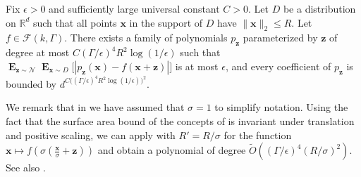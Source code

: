 \documentclass{theoretics}
\newcommand\twonorm[1]{\|#1\|_2}
\renewcommand\vec[1]{\mathbf{#1}}
\DeclareMathOperator*{\E}{\mathbf{E}}
\newcommand{\R}{\mathbb{R}}
\newcommand{\eps}{\epsilon}
\newcommand{\1}{\Ind}
\newcommand{\wt}{\widetilde}
\newcommand{\x}{\vec x}
\newcommand{\z}{\vec z}
\newcommand{\Gauss}{\mathcal{N}}
\begin{document}
\begin{proposition}
    \label{lem: boolean_bounded_approx} 
   Fix $\eps > 0$ and  sufficiently large universal constant $C > 0$. 
    Let $D$ be a distribution on $\R^d$ such that all points $\x$ in the support of $D$ have $\twonorm{\x}\leq R$. Let $f \in \mathcal F(k, \Gamma)$.
    There exists a family of polynomials $p_{\z}$ parameterized by $\z$ of degree at most $C(\Gamma/\epsilon)^4 R^2\log(1/\epsilon)$ such that
     $\E_{\z\sim \Gauss}\E_{\x \sim D}\bigl[|p_{\z}(\x)-f(\x+\z)|\bigr]$ is at most $\epsilon$, and every coefficient of $p_{\z}$ is bounded by $d^{C\bigl((\Gamma/\epsilon)^4 R^2\log(1/\epsilon)\bigr)^2}$. 
    \end{proposition}
\begin{remark}
\label{rem:scaling-invariance}
We remark that in  we have assumed that $\sigma = 1$ to simplify notation.  Using the fact that the surface area bound of the concepts of  is invariant under translation and positive scaling, we can apply 
with $R' = R/\sigma$ for the function $\x \mapsto f(\sigma (\frac{\x}{\sigma} + \vec z))$ and obtain a polynomial of degree $\wt{O}( (\Gamma/\eps)^4 (R/\sigma)^2)$.  See also .
\end{remark}
\end{document}
